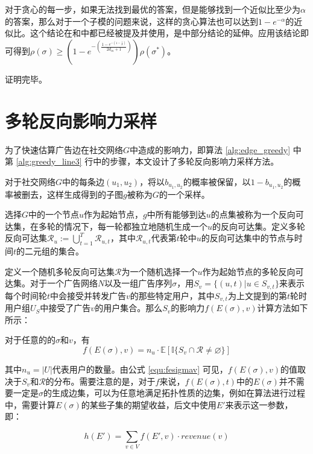 对于贪心的每一步，如果无法找到最优的答案，但是能够找到一个近似比至少为$\alpha$的答案，那么对于一个子模的问题来说，这样的贪心算法也可以达到$1-e^{-\alpha}$的近似比。这个结论在\parencite{mrim}和\parencite{goundan2007revisiting}中都已经被提及并使用，是\parencite{nemhauser1978analysis}中部分结论的延伸。应用该结论即可得到$\rho(\sigma)\ge (1-e^{-(\frac{1-e^{-(1-\frac{1}{k})}}{2d_{in}+1})})\rho(\sigma^*)$。

\noindent 证明完毕。

\section{多轮反向影响力采样}
\label{sec:mrris}
为了快速估算广告边在社交网络$G$中造成的影响力，即算法 \ref{alg:edge_greedy} 中第 \ref{alg:greedy_line3} 行中的步骤，本文设计了多轮反向影响力采样方法。

对于社交网络$G$中的每条边$(u_1,u_2)$，将以$b_{u_1,u_2}$的概率被保留，以$1-b_{u_1,u_2}$的概率被删去，这样生成得到的子图$g$被称为$G$的一个采样。

选择$G$中的一个节点$u$作为起始节点，$g$中所有能够到达$u$的点集被称为一个反向可达集，在多轮的情况下，每一轮都独立地随机生成一个$u$的反向可达集。定义多轮反向可达集$\mathcal{R}_u := \bigcup_{t=1}^{T}\mathcal{R}_{u,t}$，其中$\mathcal{R}_{u,t}$代表第$t$轮中$u$的反向可达集中的节点与时间$t$的二元组的集合。

定义一个随机多轮反向可达集$\mathcal{R}$为一个随机选择一个$u$作为起始节点的多轮反向可达集。对于一个广告网络$N$以及一组广告序列$\sigma$，用$S_v =\{(u,t) | u\in S_{v,t}\}$来表示每个时间轮$t$中会接受并转发广告$v$的那些特定用户，其中$S_{v,t}$为上文提到的第$t$轮时用户组$U_S$中接受了广告$v$的用户集合。那么$S_v$的影响力$f(E(\sigma), v)$计算方法如下所示：

\begin{lemma}
对于任意的的$\sigma$和$v$，有
\begin{equation}
    \label{equ:fesigmav}
    f(E(\sigma), v)=n_u \cdot\mathbb{E}[\mathbb{I}\{S_v\cap\mathcal{R}\ne \varnothing \}]
\end{equation}
\end{lemma}
\noindent 其中$n_u=|U|$代表用户的数量。由公式 \ref{equ:fesigmav} 可见，$f(E(\sigma),v)$的值取决于$S_v$和$\mathcal{R}$的分布。需要注意的是，对于$f$来说，$f(E(\sigma),t)$中的$E(\sigma)$并不需要一定是$\sigma$的生成边集，可以为任意地满足拓扑性质的边集，例如在算法进行过程中，需要计算$E(\sigma)$的某些子集的期望收益，后文中使用$E'$来表示这一参数，即：

\begin{equation}
    h(E')=\sum_{v \in V}f(E',v)\cdot revenue(v)
\end{equation}


